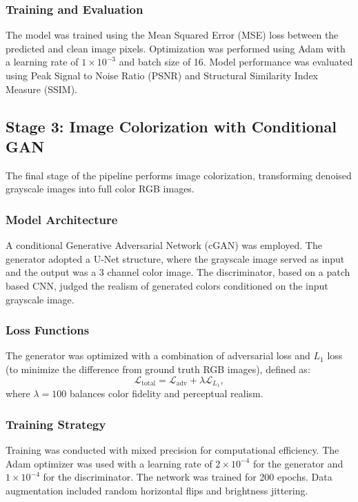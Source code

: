 \documentclass[%
 reprint,
 amsmath,amssymb,
 aps,
]{revtex4-2}
\begin{document}
\subsubsection{Training and Evaluation}

The model was trained using the Mean Squared Error (MSE) loss between the predicted and clean image pixels. Optimization was performed using Adam with a learning rate of $1 \times 10^{-3}$ and batch size of 16. Model performance was evaluated using Peak Signal to Noise Ratio (PSNR) and Structural Similarity Index Measure (SSIM). 

\subsection{Stage 3: Image Colorization with Conditional GAN}

The final stage of the pipeline performs image colorization, transforming denoised grayscale images into full color RGB images.

\subsubsection{Model Architecture}

A conditional Generative Adversarial Network (cGAN) was employed. The generator adopted a U-Net structure, where the grayscale image served as input and the output was a 3 channel color image. The discriminator, based on a patch based CNN, judged the realism of generated colors conditioned on the input grayscale image.

\subsubsection{Loss Functions}

The generator was optimized with a combination of adversarial loss  and $L_1$ loss (to minimize the difference from ground truth RGB images), defined as:
\[
\mathcal{L}_{\text{total}} = \mathcal{L}_{\text{adv}} + \lambda \mathcal{L}_{L_1},
\]
where $\lambda=100$ balances color fidelity and perceptual realism.

\subsubsection{Training Strategy}

Training was conducted with mixed precision for computational efficiency. The Adam optimizer was used with a learning rate of $2 \times 10^{-4}$ for the generator and $1 \times 10^{-4}$ for the discriminator. The network was trained for 200 epochs. Data augmentation included random horizontal flips and brightness jittering.
\end{document}

